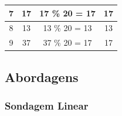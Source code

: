 \documentclass[a4paper, 12pt]{article}
\begin{document}
\begin{longtable}[c]{cccc}
	\multicolumn{1}{|c|}{{\color[HTML]{000000} 7}} &
	\multicolumn{1}{c|}{{\color[HTML]{000000} 17}} &
	\multicolumn{1}{c|}{{\color[HTML]{000000} 17 \% 20 = 17}} &
	\multicolumn{1}{c|}{{\color[HTML]{000000} 17}} \\ \hline
	\multicolumn{1}{|c|}{{\color[HTML]{000000} 8}} &
	\multicolumn{1}{c|}{{\color[HTML]{000000} 13}} &
	\multicolumn{1}{c|}{{\color[HTML]{000000} 13 \% 20 = 13}} &
	\multicolumn{1}{c|}{{\color[HTML]{000000} 13}} \\ \hline
	\multicolumn{1}{|c|}{{\color[HTML]{000000} 9}} &
	\multicolumn{1}{c|}{{\color[HTML]{000000} 37}} &
	\multicolumn{1}{c|}{{\color[HTML]{000000} 37 \% 20 = 17}} &
	\multicolumn{1}{c|}{{\color[HTML]{000000} 17}} \\ \hline
\end{longtable}
\subsection{Abordagens}
\subsubsection{Sondagem Linear}
\end{document}
